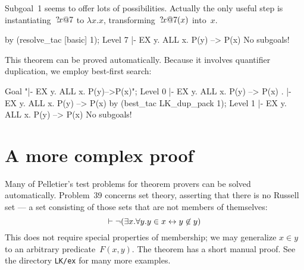 Subgoal~1 seems to offer lots of possibilities.  Actually the only useful
step is instantiating~${?\!x@7}$ to $\lambda x. x$,
transforming~${?\!x@7}(x)$ into~$x$.
\begin{ttbox}
by (resolve_tac [basic] 1);
{\out Level 7}
{\out  |- EX y. ALL x. P(y) --> P(x)}
{\out No subgoals!}
\end{ttbox}
This theorem can be proved automatically.  Because it involves quantifier
duplication, we employ best-first search:
\begin{ttbox}
Goal "|- EX y. ALL x. P(y)-->P(x)";
{\out Level 0}
{\out  |- EX y. ALL x. P(y) --> P(x)}
{.  |- EX y. ALL x. P(y) --> P(x)}
by (best_tac LK_dup_pack 1);
{\out Level 1}
{\out  |- EX y. ALL x. P(y) --> P(x)}
{\out No subgoals!}
\end{ttbox}



\section{A more complex proof}
Many of Pelletier's test problems for theorem provers \cite{pelletier86}
can be solved automatically.  Problem~39 concerns set theory, asserting
that there is no Russell set --- a set consisting of those sets that are
not members of themselves:
\[  \vdash \neg (\exists x. \forall y. y\in x \leftrightarrow y\not\in y) \]
This does not require special properties of membership; we may
generalize $x\in y$ to an arbitrary predicate~$F(x,y)$.  The theorem has a
short manual proof.  See the directory {\tt LK/ex} for many more
examples.

